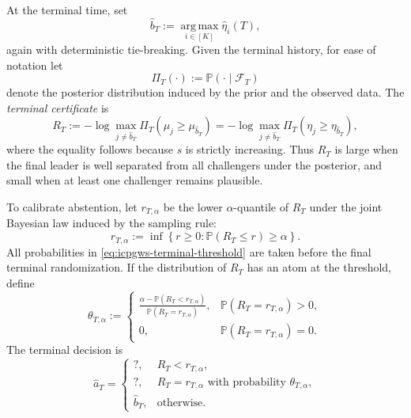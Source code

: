 \documentclass[10pt]{article}
\theoremstyle{plain}
\begin{document}
At the terminal time, set
\begin{equation}
\label{eq:icpgws-terminal-leader}
    \widehat b_T
    :=
    \operatorname*{arg\,max}_{i\in[K]}\widehat\eta_i(T),
\end{equation}
again with deterministic tie-breaking. 
Given the terminal history, for ease of notation let
\[
    \varPi_T(\cdot):=\mathbb P(\cdot\mid\mathcal F_T)
\]
denote the posterior distribution induced by the prior and the observed data.
The \emph{terminal certificate} is
\begin{equation}
\label{eq:icpgws-terminal-statistic}
    R_T
    :=
    -\log
    \max_{j\neq\widehat b_T}
    \varPi_T(\mu_j\ge \mu_{\widehat b_T})
    =
    -\log
    \max_{j\neq\widehat b_T}
    \varPi_T(\eta_j\ge \eta_{\widehat b_T}),
\end{equation}
where the equality follows because \(s\) is strictly increasing. Thus \(R_T\) is large when the final leader is
well separated from all challengers under the posterior, and small when at least
one challenger remains plausible.

To calibrate abstention, let \(r_{T,\alpha}\) be the lower \(\alpha\)-quantile of
\(R_T\) under the joint Bayesian law induced by the sampling rule:
\begin{equation}
\label{eq:icpgws-terminal-threshold}
    r_{T,\alpha}
    :=
    \inf\left\{
        r\ge0:
        \mathbb P(R_T\le r)\ge\alpha
    \right\}.
\end{equation}
All probabilities in \eqref{eq:icpgws-terminal-threshold} are taken before the
final terminal randomization.  If the distribution of \(R_T\) has an atom at the
threshold, define
\begin{equation}
\label{eq:icpgws-boundary-randomization}
    \theta_{T,\alpha}
    :=
    \begin{cases}
    \displaystyle
    \frac{
        \alpha-\mathbb P(R_T<r_{T,\alpha})
    }{
        \mathbb P(R_T=r_{T,\alpha})
    },
    & \mathbb P(R_T=r_{T,\alpha})>0,\\[12pt]
    0,
    & \mathbb P(R_T=r_{T,\alpha})=0 .
    \end{cases}
\end{equation}
The terminal decision is
\begin{equation}
\label{eq:icpgws-terminal-rule-simple-upper}
    \widehat a_T
    =
    \begin{cases}
        ?, & R_T<r_{T,\alpha},\\[3pt]
        ?, & R_T=r_{T,\alpha}
             \text{ with probability } \theta_{T,\alpha},\\[3pt]
        \widehat b_T, & \text{otherwise}.
    \end{cases}
\end{equation}
\end{document}
